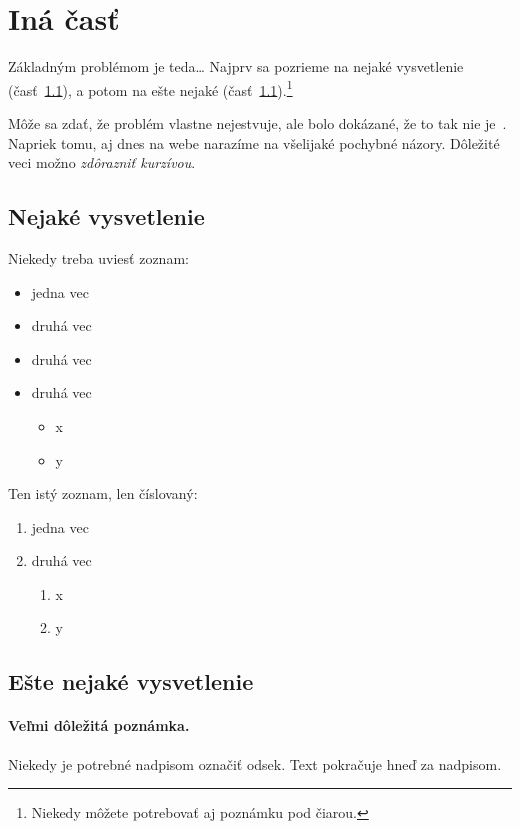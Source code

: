 \documentclass[10pt,twoside,slovak,a4paper]{article}
\begin{document}
\section{Iná časť} \label{ina}

Základným problémom je teda\ldots{} Najprv sa pozrieme na nejaké vysvetlenie (časť~\ref{ina:nejake}), a potom na ešte nejaké (časť~\ref{ina:nejake}).\footnote{Niekedy môžete potrebovať aj poznámku pod čiarou.}

Môže sa zdať, že problém vlastne nejestvuje\cite{Coplien:MPD}, ale bolo dokázané, že to tak nie je~\cite{Czarnecki:Staged, Czarnecki:Progress}. Napriek tomu, aj dnes na webe narazíme na všelijaké pochybné názory\cite{PLP-Framework}. Dôležité veci možno \emph{zdôrazniť kurzívou}.


\subsection{Nejaké vysvetlenie} \label{ina:nejake}


Niekedy treba uviesť zoznam:

\begin{itemize}
\item jedna vec
\item druhá vec
\item druhá vec
\item druhá vec
	\begin{itemize}
	\item x
	\item y
	\end{itemize}
\end{itemize}

Ten istý zoznam, len číslovaný:

\begin{enumerate}
\item jedna vec
\item druhá vec
	\begin{enumerate}
	\item x
	\item y
	\end{enumerate}
\end{enumerate}


\subsection{Ešte nejaké vysvetlenie} \label{ina:este}

\paragraph{Veľmi dôležitá poznámka.}
Niekedy je potrebné nadpisom označiť odsek. Text pokračuje hneď za nadpisom.
\end{document}
